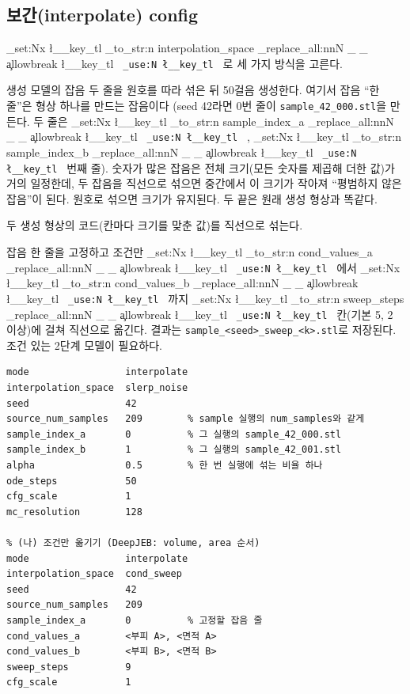\documentclass[11pt]{article}
\DeclareRobustCommand{\key}[1]{
  \tl_set:Nx \l__key_tl { \tl_to_str:n {#1} }
  \regex_replace_all:nnN { \_ } { \cO\_ \c{allowbreak} } \l__key_tl
  \texttt{ \tl_use:N \l__key_tl }
}
\begin{document}
\subsection{보간(interpolate) config}
\label{sec:interp-config}

\key{interpolation_space}로 세 가지 방식을 고른다.

\begin{description}[leftmargin=1.2em]
\item[\key{slerp_noise} (기본).] 생성 모델의 잡음 두 줄을 원호를 따라 섞은 뒤 50걸음 생성한다. 여기서 잡음 ``한 줄''은 형상 하나를 만드는 잡음이다
(seed 42라면 0번 줄이 \texttt{sample\_42\_000.stl}을 만든다. 두 줄은 \key{sample_index_a}, \key{sample_index_b}번째 줄).
숫자가 많은 잡음은 전체 크기(모든 숫자를 제곱해 더한 값)가 거의 일정한데, 두 잡음을 직선으로 섞으면 중간에서 이 크기가 작아져
``평범하지 않은 잡음''이 된다. 원호로 섞으면 크기가 유지된다. 두 끝은 원래 생성 형상과 똑같다.
\item[\key{lerp_latent} (예전 방식).] 두 생성 형상의 코드(칸마다 크기를 맞춘 값)를 직선으로 섞는다.
\item[\key{cond_sweep}.] 잡음 한 줄을 고정하고 조건만 \key{cond_values_a}에서 \key{cond_values_b}까지 \key{sweep_steps}칸(기본 5, 2 이상)에 걸쳐
직선으로 옮긴다. 결과는 \texttt{sample\_<seed>\_sweep\_<k>.stl}로 저장된다. 조건 있는 2단계 모델이 필요하다.
\end{description}

\begin{Verbatim}[fontsize=\small, frame=single, framesep=2mm]
% (가) 두 생성 형상 사이 섞기
mode                 interpolate
interpolation_space  slerp_noise
seed                 42
source_num_samples   209        % sample 실행의 num_samples와 같게
sample_index_a       0          % 그 실행의 sample_42_000.stl
sample_index_b       1          % 그 실행의 sample_42_001.stl
alpha                0.5        % 한 번 실행에 섞는 비율 하나
ode_steps            50
cfg_scale            1
mc_resolution        128

% (나) 조건만 옮기기 (DeepJEB: volume, area 순서)
mode                 interpolate
interpolation_space  cond_sweep
seed                 42
source_num_samples   209
sample_index_a       0          % 고정할 잡음 줄
cond_values_a        <부피 A>, <면적 A>
cond_values_b        <부피 B>, <면적 B>
sweep_steps          9
cfg_scale            1
\end{Verbatim}
\end{document}
